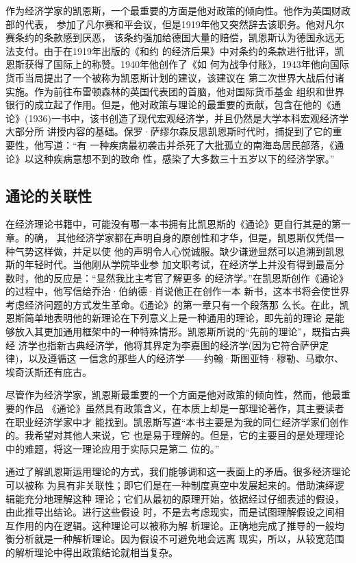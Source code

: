 作为经济学家的凯恩斯，一个最重要的方面是他对政策的倾向性。他作为英国财政部的代表，
参加了凡尔赛和平会议，但是1919年他又突然辞去该职务。他对凡尔赛条约的条款感到厌恶，
该条约强加给德国大量的赔偿，凯恩斯认为德国永远无法支付。由于在1919年出版的《和约
的经济后果》中对条约的条款进行批评，凯恩斯获得了国际上的称赞。1940年他创作了《如
何为战争付账》，1943年他向国际货币当局提出了一个被称为凯恩斯计划的建议，该建议在
第二次世界大战后付诸实施。作为前往布雷顿森林的英国代表团的首脑，他对国际货币基金
组织和世界银行的成立起了作用。但是，他对政策与理论的最重要的贡献，包含在他的《通
论》(1936)一书中，该书创造了现代宏观经济学，并且仍然是大学本科宏观经济学大部分所
讲授内容的基础。保罗·萨缪尔森反思凯恩斯时代时，捕捉到了它的重要性，他写道：“有
一种疾病最初袭击并杀死了大批孤立的南海岛居民部落，《通论》以这种疾病意想不到的致命
性，感染了大多数三十五岁以下的经济学家。”

\subsection{通论的关联性}

在经济理论书籍中，可能没有哪一本书拥有比凯恩斯的《通论》更自行其是的第一章。的确，
其他经济学家都在声明自身的原创性和才华，但是，凯恩斯仅凭借一种气势这样做，并足以使
他的声明令人心悦诚服。缺少谦逊显然可以追溯到凯恩斯的年轻时代。当他刚从学院毕业参
加文职考试，在经济学上并没有得到最高分数时，他的反应是：“显然我比主考官了解更多
的经济学。”在凯恩斯创作《通论》的过程中，他写信给乔治·伯纳德·肖说他正在创作一本
新书，这本书将会使世界考虑经济问题的方式发生革命。《通论》的第一章只有一个段落那
么长。在此，凯恩斯简单地表明他的新理论在下列意义上是一种通用的理论，即先前的理论
是能够放入其更加通用框架中的一种特殊情形。凯恩斯所说的“先前的理论”，既指古典经
济学也指新古典经济学，他将其界定为李嘉图的经济学(因为它符合萨伊定律)，以及遵循这
一信念的那些人的经济学——约翰·斯图亚特·穆勒、马歇尔、埃奇沃斯还有庇古。

尽管作为经济学家，凯恩斯最重要的一个方面是他对政策的倾向性，然而，他最重要的作品
《通论》虽然具有政策含义，在本质上却是一部理论著作，其主要读者在职业经济学家中才
能找到。凯恩斯写道“本书主要是为我的同仁经济学家们创作的。我希望对其他人来说，它
也是易于理解的。但是，它的主要目的是处理理论中的难题，将这一理论应用于实际只是第二
位的。”

通过了解凯恩斯运用理论的方式，我们能够调和这一表面上的矛盾。很多经济理论可以被称
为具有非关联性；即它们是在一种制度真空中发展起来的。借助演绎逻辑能充分地理解这种
理论；它们从最初的原理开始，依据经过仔细表述的假设，由此推导出结论。进行这些假设
时，不是去考虑现实，而是试图理解假设之间相互作用的内在逻辑。这种理论可以被称为解
析理论。正确地完成了推导的一般均衡分析就是一种解析理论。因为假设不可避免地会远离
现实，所以，从较宽范围的解析理论中得出政策结论就相当复杂。

